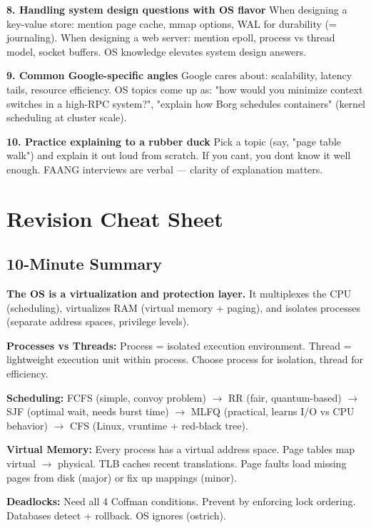 \documentclass[11pt]{article}
\begin{document}
\textbf{8. Handling system design questions with OS flavor}
When designing a key-value store: mention page cache, mmap options, WAL for durability (= journaling). When designing a web server: mention epoll, process vs thread model, socket buffers. OS knowledge elevates system design answers.

\textbf{9. Common Google-specific angles}
Google cares about: scalability, latency tails, resource efficiency. OS topics come up as: "how would you minimize context switches in a high-RPC system?", "explain how Borg schedules containers" (kernel scheduling at cluster scale).

\textbf{10. Practice explaining to a rubber duck}
Pick a topic (say, "page table walk") and explain it out loud from scratch. If you can\textquotesingle t, you don\textquotesingle t know it well enough. FAANG interviews are verbal --- clarity of explanation matters.

\section{Revision Cheat Sheet}\label{revision-cheat-sheet}

\subsection{10-Minute Summary}\label{10-minute-summary}

\textbf{The OS is a virtualization and protection layer.} It multiplexes the CPU (scheduling), virtualizes RAM (virtual memory + paging), and isolates processes (separate address spaces, privilege levels).

\textbf{Processes vs Threads:} Process = isolated execution environment. Thread = lightweight execution unit within process. Choose process for isolation, thread for efficiency.

\textbf{Scheduling:} FCFS (simple, convoy problem) \(\rightarrow\) RR (fair, quantum-based) \(\rightarrow\) SJF (optimal wait, needs burst time) \(\rightarrow\) MLFQ (practical, learns I/O vs CPU behavior) \(\rightarrow\) CFS (Linux, vruntime + red-black tree).

\textbf{Virtual Memory:} Every process has a virtual address space. Page tables map virtual \(\rightarrow\) physical. TLB caches recent translations. Page faults load missing pages from disk (major) or fix up mappings (minor).

\textbf{Deadlocks:} Need all 4 Coffman conditions. Prevent by enforcing lock ordering. Databases detect + rollback. OS ignores (ostrich).
\end{document}
